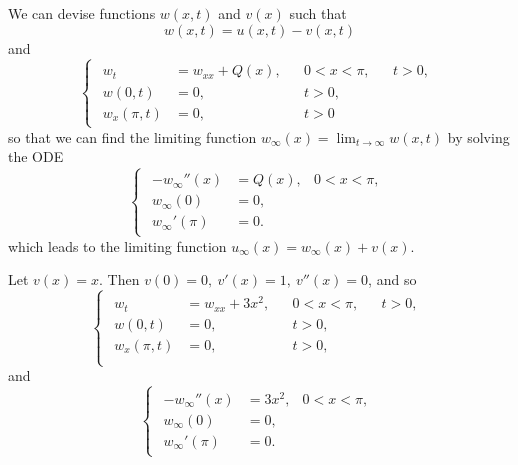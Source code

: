 \documentclass[plain]{pset}
\begin{document}
\begin{solution}
    We can devise functions \(w(x, t)\) and \(v(x)\) such that
    \[w(x, t) = u(x, t) - v(x, t)\]
    and
    \[
        \begin{cases}
            \begin{aligned}
                w_t         & = w_{xx} + Q(x), &  & 0 < x < \pi, &  & t > 0, \\
                w(0, t)     & = 0,             &  & t > 0,                   \\
                w_x(\pi, t) & = 0,             &  & t > 0
            \end{aligned}
        \end{cases}
    \]
    so that we can find the limiting function \(w_\infty(x) = \lim_{t \to \infty} w(x, t)\) by solving the ODE
    \[
        \begin{cases}
            \begin{aligned}
                -w_\infty''(x) & = Q(x), & 0 < x < \pi, \\
                w_\infty(0)    & = 0,                   \\
                w_\infty'(\pi) & = 0.
            \end{aligned}
        \end{cases}
    \]
    which leads to the limiting function \(u_\infty(x) = w_\infty(x) + v(x)\).

    Let \(v(x) = x\). Then \(v(0) = 0, \> v'(x) = 1, \> v''(x) = 0\), and so
    \[
        \begin{cases}
            \begin{aligned}
                w_t         & = w_{xx} + 3x^2, &  & 0 < x < \pi, &  & t > 0, \\
                w(0, t)     & = 0,             &  & t > 0,                   \\
                w_x(\pi, t) & = 0,             &  & t > 0,                   \\
            \end{aligned}
        \end{cases}
    \]
    and
    \[
        \begin{cases}
            \begin{aligned}
                -w_\infty''(x) & = 3x^2, & 0 < x < \pi, \\
                w_\infty(0)    & = 0,                   \\
                w_\infty'(\pi) & = 0.
            \end{aligned}
        \end{cases}
    \]


\end{solution}
\end{document}
